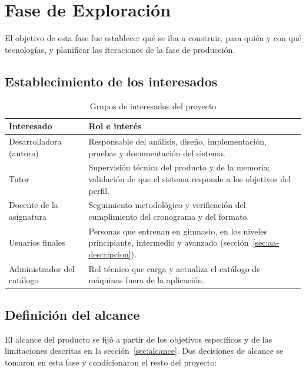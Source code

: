 \section{Fase de Exploración}
\label{sec:exploracion}

El objetivo de esta fase fue establecer qué se iba a construir, para quién y
con qué tecnologías, y planificar las iteraciones de la fase de producción.

\subsection{Establecimiento de los interesados}

\begin{table}[H]
\centering
\caption{Grupos de interesados del proyecto}
\label{tab:interesados}
\begin{tabularx}{\textwidth}{|L{3.4cm}|Y|}
\hline
{} \textbf{Interesado} & \textbf{Rol e interés} \\
\hline
Desarrolladora (autora) & Responsable del análisis, diseño, implementación,
pruebas y documentación del sistema. \\ \hline
Tutor & Supervisión técnica del producto y de la memoria; validación de que el
sistema responde a los objetivos del perfil. \\ \hline
Docente de la asignatura & Seguimiento metodológico y verificación del
cumplimiento del cronograma y del formato. \\ \hline
Usuarios finales & Personas que entrenan en gimnasio, en los niveles
principiante, intermedio y avanzado (sección~\ref{sec:aa-descripcion}). \\ \hline
Administrador del catálogo & Rol técnico que carga y actualiza el catálogo de
máquinas fuera de la aplicación. \\
\hline
\end{tabularx}
\end{table}

\subsection{Definición del alcance}

El alcance del producto se fijó a partir de los objetivos específicos y de las
limitaciones descritas en la sección~\ref{sec:alcance}. Dos decisiones de
alcance se tomaron en esta fase y condicionaron el resto del proyecto:

